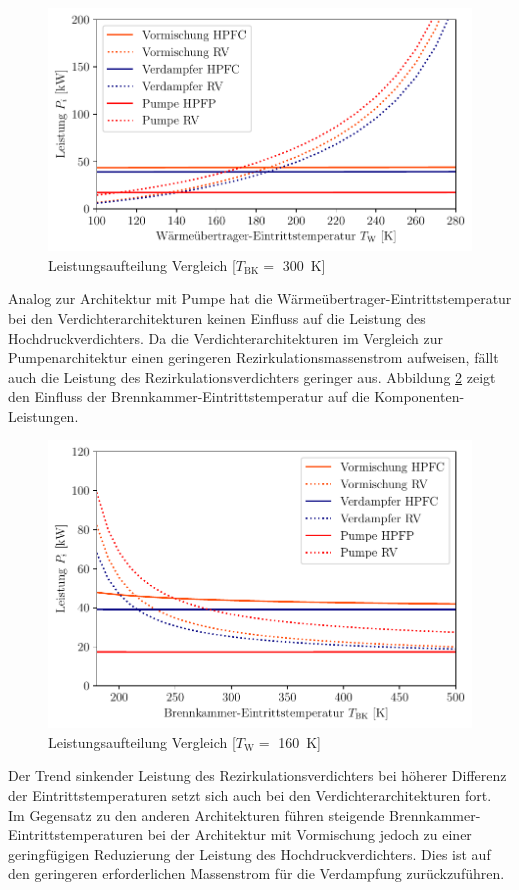 \begin{figure}[ht]
\centering
\includegraphics[width=0.9\linewidth]{4_Abbildungen/2_Hauptteil/Ergebnisse/300summary_powersplit.pdf}
  \caption{Leistungsaufteilung Vergleich [$T_\mathrm{BK}=$ \SI{300}{\K}]}
  \label{fig:comp_split}
\end{figure}
\FloatBarrier

Analog zur Architektur mit Pumpe hat die Wärmeübertrager-Eintrittstemperatur bei den Verdichterarchitekturen keinen Einfluss auf die Leistung des Hochdruckverdichters. Da die Verdichterarchitekturen im Vergleich zur Pumpenarchitektur einen geringeren Rezirkulationsmassenstrom aufweisen, fällt auch die Leistung des Rezirkulationsverdichters geringer aus. Abbildung \ref{fig:tbk_split} zeigt den Einfluss der Brennkammer-Eintrittstemperatur auf die Komponenten-Leistungen.

\begin{figure}[ht]
\centering
\includegraphics[width=0.7\linewidth]{4_Abbildungen/2_Hauptteil/Ergebnisse/tbkcomp.pdf}
  \caption{Leistungsaufteilung Vergleich [$T_\mathrm{W}=$ \SI{160}{\K}]}
  \label{fig:tbk_split}
\end{figure}
\FloatBarrier

Der Trend sinkender Leistung des Rezirkulationsverdichters bei höherer Differenz der Eintrittstemperaturen setzt sich auch bei den Verdichterarchitekturen fort. Im Gegensatz zu den anderen Architekturen führen steigende Brennkammer-Eintrittstemperaturen bei der Architektur mit Vormischung jedoch zu einer geringfügigen Reduzierung der Leistung des Hochdruckverdichters. Dies ist auf den geringeren erforderlichen Massenstrom für die Verdampfung zurückzuführen. 

